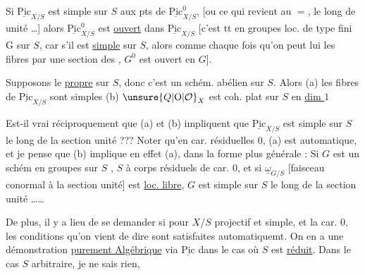   Si $\underline{\mathrm{Pic}}_{X/S}$ est simple sur $S$ aux pts de $\underline{\mathrm{Pic}}^0_{X/S}$,  [ou ce
qui revient au $=$, le long de  unité \ldots{}]
  alors
$\underline{\mathrm{Pic}}^0_{X/S}$ est \uline{ouvert} dans $\underline{\mathrm{Pic}}_{X/S}$ [c'est  tt  en
groupes loc. de type fini G sur $S$, car s'il est \uline{simple} sur $S$,
alors  comme chaque fois qu'on peut lui 
  les fibres par une section des 
  ,
$G^0$ est ouvert en $G$].

Supposons le \uline{propre} sur $S$, donc c'est un schém. abélien
sur $S$. Alors (a) les fibres de $\underline{\mathrm{Pic}}_{X/S}$ sont simples
(b) \deleted{\unsure{$\Omega$}}$\unsure{Q|\mathrm O|\mathcal O}_X$ est coh. plat sur $S$ en  \uline{dim $1$}

\deleted{[ \unsure{Réuni|Réun.|Réc.}.} Est-il vrai réciproquement que (a) et (b)
impliquent que $\underline{\mathrm{Pic}}_{X/S}$ est simple sur $S$ le long de
la section unité ??? Noter qu'en car. résiduelles $0$,
(a) est automatique, et  je pense que (b)
implique en effet (a), dans la forme plus générale :
Si $G$ est un schém en groupes sur $S$ , $S$ à
corps résiduels de car. $0$, et si \deleted{\unsure{$\Omega$}} $\underline\omega_{G/S}$ [faisceau
conormal à la section unité] est \uline{loc. libre},  $G$ est
simple sur $S$ le long de la section unité \ldots\ldots

De plus, il y a lieu de se demander si pour $X/S$
projectif et simple, et la car. $0$, les conditions
qu'on vient de dire sont satisfaites automatiquemt. On
en a une démonstration \uline{purement Algébrique}
via $\underline{\mathrm{Pic}}$ dans le cas où $S$ est \uline{réduit}. Dans le
cas $S$ arbitraire, je ne sais rien, \uline{}

